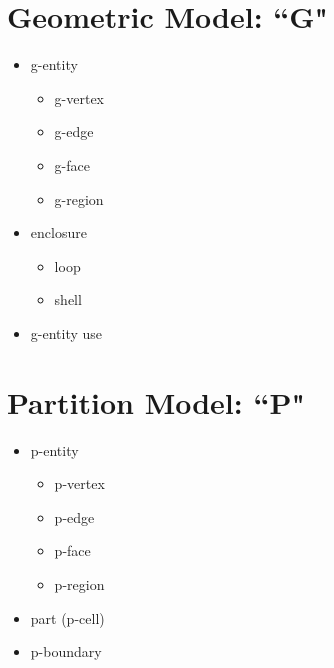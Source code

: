 \documentclass[twocolumn]{article}
\begin{document}
\section{Geometric Model: ``G"}
\begin{itemize}
\item g-entity
\begin{itemize}
\item g-vertex
\item g-edge
\item g-face
\item g-region
\end{itemize}
\item enclosure
\begin{itemize}
\item loop
\item shell
\end{itemize}
\item g-entity use
\end{itemize}
\section{Partition Model: ``P"}
\begin{itemize}
\item p-entity
\begin{itemize}
\item p-vertex
\item p-edge
\item p-face
\item p-region
\end{itemize}
\item part (p-cell)
\item p-boundary
\end{itemize}
\end{document}

